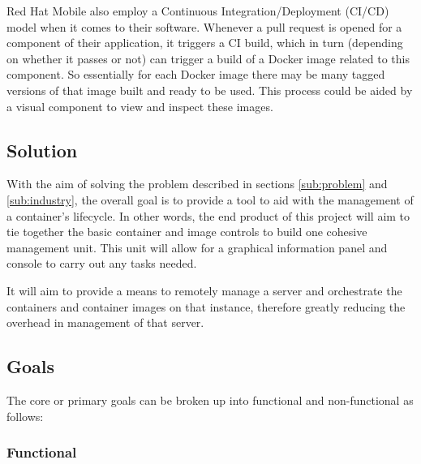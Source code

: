Red Hat Mobile also employ a Continuous Integration/Deployment (CI/CD) model when it comes to their software. Whenever a pull request is opened for a component of their application, it triggers a CI build, which in turn (depending on whether it passes or not) can trigger a build of a Docker image related to this component. So essentially for each Docker image there may be many tagged versions of that image built and ready to be used. This process could be aided by a visual component to view and inspect these images.


\subsection{Solution}
With the aim of solving the problem described in sections \ref{sub:problem} and \ref{sub:industry}, the overall goal is to provide a tool to aid with the management of a container's lifecycle. In other words, the end product of this project will aim to tie together the basic container and image controls to build one cohesive management unit. This unit will allow for a graphical information panel and console to carry out any tasks needed.

It will aim to provide a means to remotely manage a server and orchestrate the containers and container images on that instance, therefore greatly reducing the overhead in management of that server.

\subsection{Goals}
\label{sub:goals}
The core or primary goals can be broken up into functional and non-functional as follows:

\subsubsection{Functional}


